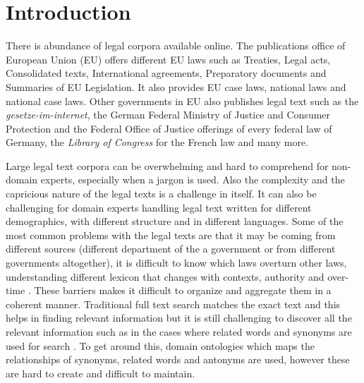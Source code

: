 



\section{Introduction}

There is abundance of legal corpora available online. The publications office of European Union (EU) offers different EU laws such as Treaties, Legal acts, Consolidated texts, International agreements, Preparatory documents and Summaries of EU Legislation. It also provides EU case laws, national laws and national case laws. Other governments in EU also publishes legal text such as the \textit{gesetze-im-internet}, the German Federal Ministry of Justice and Consumer Protection and the Federal Office of Justice offerings of every federal law of Germany, the \textit{Library of Congress} for the French law and many more.

Large legal text corpora can be overwhelming and hard to comprehend for non-domain experts, especially when a jargon is used. Also the complexity and the capricious nature of the legal texts is a challenge in itself. It can also be challenging for domain experts handling legal text written for different demographics, with different structure and in different languages. Some of the most common problems with the legal texts are that it may be coming from different sources (different department of the a government or from different governments altogether), it is difficult to know which laws overturn other laws, understanding different lexicon that changes with contexts, authority and over-time \cite{boella2012nlp}. These barriers makes it difficult to organize and aggregate them in a coherent manner. Traditional full text search matches the exact text and this helps in finding relevant information but it is still challenging to discover all the relevant information such as in the cases where related words and synonyms are used for search \cite{landthaler2016extending}. To get around this, domain ontologies which maps the relationships of synonyms, related words and antonyms are used, however these are hard to create and difficult to maintain. 

